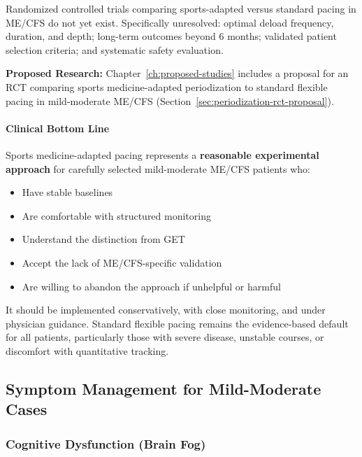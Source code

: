 \begin{open_question}
\label{q:sports-pacing-gaps}
Randomized controlled trials comparing sports-adapted versus standard pacing in ME/CFS do not yet exist. Specifically unresolved: optimal deload frequency, duration, and depth; long-term outcomes beyond 6 months; validated patient selection criteria; and systematic safety evaluation.
\end{open_question}

\textbf{Proposed Research:} Chapter~\ref{ch:proposed-studies} includes a proposal for an RCT comparing sports medicine-adapted periodization to standard flexible pacing in mild-moderate ME/CFS (Section~\ref{sec:periodization-rct-proposal}).

\paragraph{Clinical Bottom Line}

Sports medicine-adapted pacing represents a \textbf{reasonable experimental approach} for carefully selected mild-moderate ME/CFS patients who:
\begin{itemize}
    \item Have stable baselines
    \item Are comfortable with structured monitoring
    \item Understand the distinction from GET
    \item Accept the lack of ME/CFS-specific validation
    \item Are willing to abandon the approach if unhelpful or harmful
\end{itemize}

It should be implemented conservatively, with close monitoring, and under physician guidance. Standard flexible pacing remains the evidence-based default for all patients, particularly those with severe disease, unstable courses, or discomfort with quantitative tracking.

\subsection{Symptom Management for Mild-Moderate Cases}
\label{sec:symptom-management-mild-moderate}

\subsubsection{Cognitive Dysfunction (Brain Fog)}

